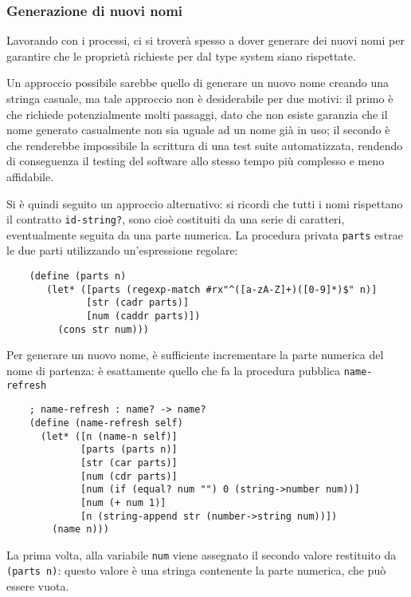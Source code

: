 \subsubsection{Generazione di nuovi nomi}

Lavorando con i processi, ci si trover\`a spesso a dover generare dei
nuovi nomi per garantire che le propriet\`a richieste per dal type
system siano rispettate.

Un approccio possibile sarebbe quello di generare un nuovo nome creando
una stringa casuale, ma tale approccio non \`e desiderabile per due
motivi: il primo \`e che richiede potenzialmente molti passaggi, dato
che non esiste garanzia che il nome generato casualmente non sia uguale
ad un nome gi\`a in uso; il secondo \`e che renderebbe impossibile la
scrittura di una test suite automatizzata, rendendo di conseguenza il
testing del software allo stesso tempo pi\`u complesso e meno affidabile.

Si \`e quindi seguito un approccio alternativo: si ricordi che tutti i
nomi rispettano il contratto \lstinline{id-string?}, sono cio\`e
costituiti da una serie di caratteri, eventualmente seguita da una parte
numerica. La procedura privata \lstinline{parts} estrae le due parti
utilizzando un'espressione regolare:

\begin{lstlisting}
    (define (parts n)
       (let* ([parts (regexp-match #rx"^([a-zA-Z]+)([0-9]*)$" n)]
              [str (cadr parts)]
              [num (caddr parts)])
         (cons str num)))
\end{lstlisting}

Per generare un nuovo nome, \`e sufficiente incrementare la parte numerica
del nome di partenza: \`e esattamente quello che fa la procedura pubblica
\lstinline{name-refresh}

\begin{lstlisting}
    ; name-refresh : name? -> name?
    (define (name-refresh self)
      (let* ([n (name-n self)]
             [parts (parts n)]
             [str (car parts)]
             [num (cdr parts)]
             [num (if (equal? num "") 0 (string->number num))]
             [num (+ num 1)]
             [n (string-append str (number->string num))])
        (name n)))
\end{lstlisting}

La prima volta, alla variabile \lstinline{num} viene assegnato il secondo
valore restituito da \lstinline{(parts n)}: questo valore \`e una stringa
contenente la parte numerica, che pu\`o essere vuota.

